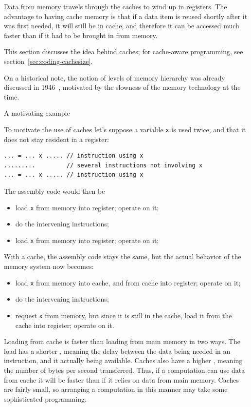 Data from
memory travels through the caches to wind up in registers. The
advantage to having cache memory is that if a data item is reused
shortly after it was first needed, it will still be in cache, and
therefore it can be accessed much faster than if it had to be
brought in from memory.

This section discusses the idea behind caches;
for cache-aware programming, see section~\ref{sec:coding-cachesize}.

On a historical note, the notion of levels of memory hierarchy was
already discussed in 1946~\cite{Burks:discussion}, motivated
by the slowness of the memory technology at the time.

 {A motivating example}


To motivate the use of caches let's suppose a variable \lstinline{x} is used twice,
and that it does not stay resident in a register:
\begin{lstlisting}
... = ... x ..... // instruction using x
.........         // several instructions not involving x
... = ... x ..... // instruction using x
\end{lstlisting}
The assembly code would then be
\begin{itemize}
\item load \lstinline{x} from memory into register; operate on it;
\item do the intervening instructions;
\item load \lstinline{x} from memory into register; operate on it;
\end{itemize}
With a cache, the assembly code stays the same, but the actual
behavior of the memory system now becomes:
\begin{itemize}
\item load \lstinline{x} from memory into cache, and from cache into register;
  operate on it;
\item do the intervening instructions;
\item request \lstinline{x} from memory, but since it is still in the cache,
  load it from the cache into register; operate on it.
\end{itemize}
Loading from cache is faster
than loading from main memory in two ways.
The load has a shorter ,
meaning the delay between the data being needed in an instruction,
and it actually being available.
Caches also have a higher ,
meaning the number of bytes per second transferred.
Thus, if a computation can use data from cache
it will be faster than if it relies on data from main memory.
Caches are fairly small, so arranging a computation in this manner
may take some sophisticated programming.

